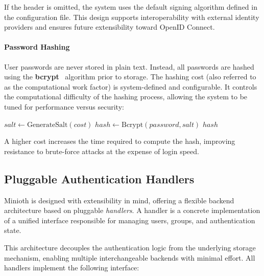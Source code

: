 If the header is omitted, the system uses the default signing algorithm defined in the configuration file. 
This design supports interoperability with external identity providers and ensures future extensibility toward OpenID Connect.

\paragraph{Password Hashing}
User passwords are never stored in plain text. Instead, all passwords are hashed using the \textbf{bcrypt}~\cite{bcrypt} 
algorithm prior to storage. The hashing cost (also referred to as the computational work factor) is system-defined and configurable. 
It controls the computational difficulty of the hashing process, allowing the system to be tuned for performance versus security:

\begin{algorithm}
\caption{Password Hashing using \texttt{bcrypt}}\label{alg:bcrypt}
\begin{algorithmic}[1]
    \State $salt \gets \text{GenerateSalt}(cost)$
    \State $hash \gets \text{Bcrypt}(password, salt)$
    \State \Return $hash$
\EndProcedure
\end{algorithmic}
\end{algorithm}


A higher cost increases the time required to compute the hash, improving resistance to brute-force attacks at the expense of login speed.

\subsection{Pluggable Authentication Handlers}

Minioth is designed with extensibility in mind, offering a flexible backend architecture based on pluggable \textit{handlers}. A handler is a concrete implementation of a unified interface responsible for managing users, groups, and authentication state.

This architecture decouples the authentication logic from the underlying storage mechanism, enabling multiple interchangeable backends with minimal effort. All handlers implement the following interface:

